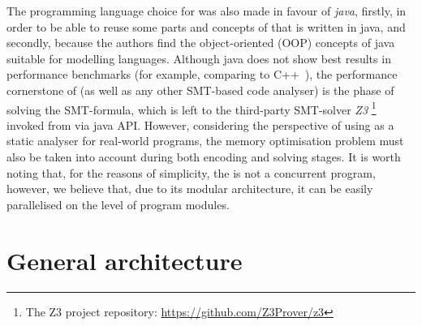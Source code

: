 The programming language choice for \porthos[2] was also made in favour of \textit{java}, firstly, in order to be able to reuse some parts and concepts of \porthos[1] that is written in java, and secondly, because the authors find the object-oriented (OOP) concepts of java suitable for modelling languages.
Although java does not show best results in performance benchmarks (for example, comparing to C++~\cite{hundt2011loop, oaks2014java}), the performance cornerstone of \porthos[2] (as well as any other SMT-based code analyser) is the phase of solving the SMT-formula, which is left to the third-party SMT-solver \textit{Z3}%
\footnote{The Z3 project repository: \url{https://github.com/Z3Prover/z3}} %
invoked from \porthos[2] via java API.
However, considering the perspective of using \porthos[2] as a static analyser for real-world programs, the memory optimisation problem must also be taken into account during both encoding and solving stages.
It is worth noting that, for the reasons of simplicity, the \porthos[2] is not a concurrent program, however, we believe that, due to its modular architecture, it can be easily parallelised on the level of program modules.


\section{General architecture}
\label{ch:impl:arch}

